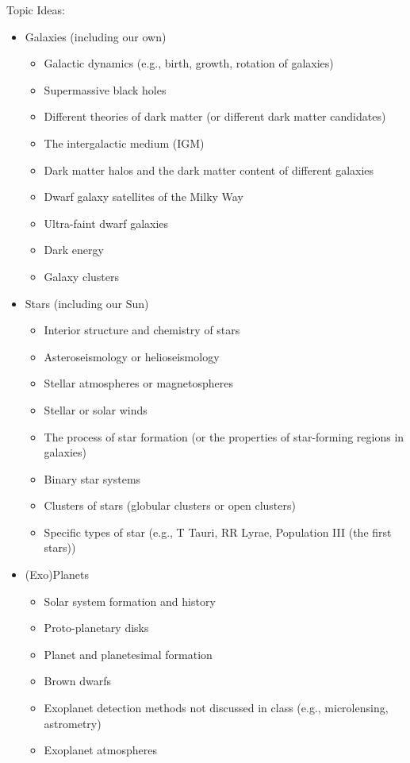 \documentclass[11pt]{article}
\begin{document}
\medskip \noindent
Topic Ideas:
\begin{itemize}[noitemsep]
    \item Galaxies (including our own)
        \begin{itemize}[noitemsep]
            \item Galactic dynamics (e.g., birth, growth, rotation of galaxies)
            \item Supermassive black holes
            \item Different theories of dark matter (or different dark matter candidates)
            \item The intergalactic medium (IGM)
            \item Dark matter halos and the dark matter content of different galaxies
            \item Dwarf galaxy satellites of the Milky Way
            \item Ultra-faint dwarf galaxies
            \item Dark energy
            \item Galaxy clusters
        \end{itemize}

    \item Stars (including our Sun)
        \begin{itemize}[noitemsep]
            \item Interior structure and chemistry of stars
            \item Asteroseismology or helioseismology 
            \item Stellar atmospheres or magnetospheres
            \item Stellar or solar winds
            \item The process of star formation (or the properties of star-forming regions in galaxies)
            \item Binary star systems
            \item Clusters of stars (globular clusters or open clusters)
            \item Specific types of star (e.g., T Tauri, RR Lyrae, Population III (the first stars))
        \end{itemize}

    \item (Exo)Planets
        \begin{itemize}[noitemsep]
            \item Solar system formation and history
            \item Proto-planetary disks
            \item Planet and planetesimal formation
            \item Brown dwarfs
            \item Exoplanet detection methods not discussed in class (e.g., microlensing, astrometry)
            \item Exoplanet atmospheres
        \end{itemize}
    

\end{itemize}
\end{document}
